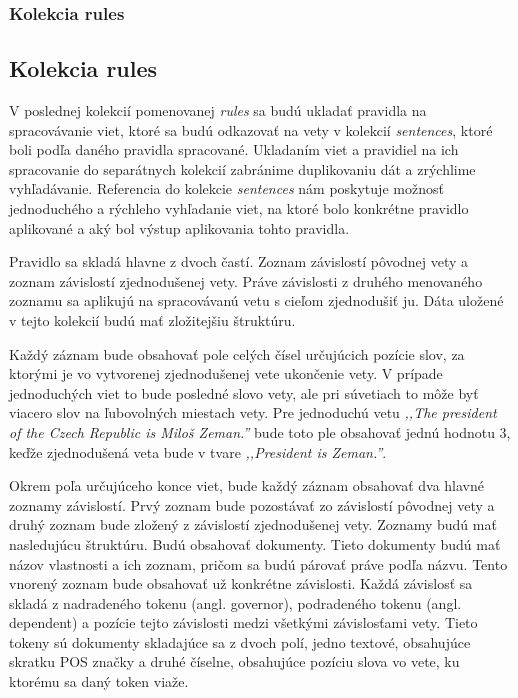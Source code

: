 %
%
{
	\subsubsection{Kolekcia rules}
}
{
	\subsection{Kolekcia rules}
}
V poslednej kolekcií pomenovanej \textit{rules} sa budú ukladať pravidla na spracovávanie viet, ktoré sa budú odkazovať na vety v kolekcií \textit{sentences}, ktoré boli podľa daného pravidla spracované. Ukladaním viet a pravidiel na ich spracovanie do separátnych kolekcií zabránime duplikovaniu dát a zrýchlime vyhľadávanie. Referencia do kolekcie \textit{sentences} nám poskytuje možnosť jednoduchého a rýchleho vyhľadanie viet, na ktoré bolo konkrétne pravidlo aplikované a aký bol výstup aplikovania tohto pravidla.

Pravidlo sa skladá hlavne z dvoch častí. Zoznam závislostí pôvodnej vety a zoznam závislostí zjednodušenej vety. Práve závislosti z druhého menovaného zoznamu sa aplikujú na spracovávanú vetu s cieľom zjednodušiť ju. Dáta uložené v tejto kolekcií budú mať zložitejšiu štruktúru. 

Každý záznam bude obsahovať pole celých čísel určujúcich pozície slov, za ktorými je vo vytvorenej zjednodušenej vete ukončenie vety. V prípade jednoduchých viet to bude posledné slovo vety, ale pri súvetiach to môže byť viacero slov na ľubovolných miestach vety. Pre jednoduchú vetu \textit{,,The president of the Czech Republic is Miloš Zeman.''} bude toto ple obsahovať jednú hodnotu 3, keďže zjednodušená veta bude v tvare \textit{,,President is Zeman.''}.

Okrem poľa určujúceho konce viet, bude každý záznam obsahovať dva hlavné zoznamy závislostí. Prvý zoznam bude pozostávať zo závislostí pôvodnej vety a druhý zoznam bude zložený z závislostí zjednodušenej vety. Zoznamy budú mať nasledujúcu štruktúru. Budú obsahovať dokumenty. Tieto dokumenty budú mať názov vlastnosti a ich zoznam, pričom sa budú párovať práve podľa názvu. Tento vnorený zoznam bude obsahovať už konkrétne závislosti. Každá závislosť sa skladá z nadradeného tokenu (angl. governor), podradeného tokenu (angl. dependent) a pozície tejto závislosti medzi všetkými závislosťami vety. Tieto tokeny sú dokumenty skladajúce sa z dvoch polí, jedno textové, obsahujúce skratku POS značky a druhé číselne, obsahujúce pozíciu slova vo vete, ku ktorému sa daný token viaže.

